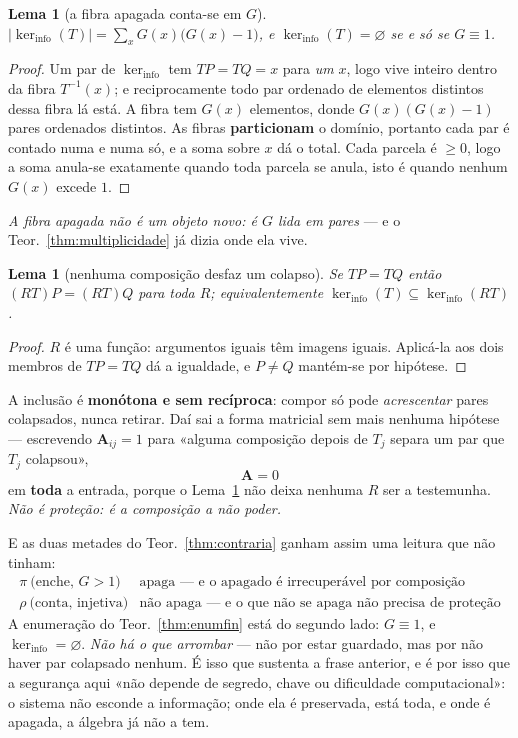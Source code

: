 \documentclass[11pt,a4paper]{article}
\newtheorem{lema}[teorema]{Lema}
\begin{document}
\begin{lema}[a fibra apagada conta-se em $G$]\label{lem:kerinfo}
$\displaystyle\bigl\lvert\ker_{\mathrm{info}}(T)\bigr\rvert
=\sum_{x}G(x)\bigl(G(x)-1\bigr)$, e
$\ker_{\mathrm{info}}(T)=\varnothing$ se e só se $G\equiv1$.
\end{lema}

\begin{proof}
Um par de $\ker_{\mathrm{info}}$ tem $TP=TQ=x$ para \emph{um} $x$, logo vive
inteiro dentro da fibra $T^{-1}(x)$; e reciprocamente todo par ordenado de
elementos distintos dessa fibra lá está. A fibra tem $G(x)$ elementos, donde
$G(x)(G(x)-1)$ pares ordenados distintos. As fibras \textbf{particionam} o
domínio, portanto cada par é contado numa e numa só, e a soma sobre $x$ dá o
total. Cada parcela é $\ge0$, logo a soma anula-se exatamente quando toda parcela
se anula, isto é quando nenhum $G(x)$ excede $1$.
\end{proof}

\noindent \emph{A fibra apagada não é um objeto novo: é $G$ lida em pares} --- e o
Teor.~\ref{thm:multiplicidade} já dizia onde ela vive.

\begin{lema}[nenhuma composição desfaz um colapso]\label{lem:dpi}
Se $TP=TQ$ então $(RT)P=(RT)Q$ para \emph{toda} $R$; equivalentemente
$\ker_{\mathrm{info}}(T)\subseteq\ker_{\mathrm{info}}(RT)$.
\end{lema}

\begin{proof}
$R$ é uma função: argumentos iguais têm imagens iguais. Aplicá-la aos dois membros
de $TP=TQ$ dá a igualdade, e $P\neq Q$ mantém-se por hipótese.
\end{proof}

\noindent A inclusão é \textbf{monótona e sem recíproca}: compor só pode
\emph{acrescentar} pares colapsados, nunca retirar. Daí sai a forma matricial sem
mais nenhuma hipótese --- escrevendo $\mathbf{A}_{ij}=1$ para «alguma composição
depois de $T_j$ separa um par que $T_j$ colapsou»,
\[
\boxed{\;\mathbf{A}=0\;}
\]
em \textbf{toda} a entrada, porque o Lema~\ref{lem:dpi} não deixa nenhuma $R$ ser a
testemunha. \emph{Não é proteção: é a composição a não poder.}

\medskip\noindent E as duas metades do Teor.~\ref{thm:contraria} ganham assim uma
leitura que não tinham:
\[
\begin{array}{ll}
\pi\ \text{(enche, }G>1\text{)} & \text{apaga --- e o apagado é irrecuperável por composição}\\
\rho\ \text{(conta, injetiva)} & \text{não apaga --- e o que não se apaga não precisa de proteção}
\end{array}
\]
A enumeração do Teor.~\ref{thm:enumfin} está do segundo lado: $G\equiv1$, e
$\ker_{\mathrm{info}}=\varnothing$. \emph{Não há o que arrombar} --- não por estar
guardado, mas por não haver par colapsado nenhum. É isso que sustenta a frase
anterior, e é por isso que a segurança aqui «não depende de segredo, chave ou
dificuldade computacional»: o sistema não esconde a informação; onde ela é
preservada, está toda, e onde é apagada, a álgebra já não a tem.
\end{document}

